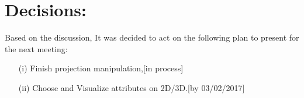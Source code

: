 \documentclass[a4paper, 11pt]{article}
\begin{document}
	\section*{Decisions:}
	
	Based on the discussion, It was decided to act on the following plan to present for the next meeting:
	\begin{itemize}
		\item[(i)] Finish projection manipulation,\hfill {\color{RedOrange}[in process]}
		\item[(ii)] Choose and Visualize attributes on 2D/3D.\hfill {\color{Red}[by 03/02/2017]}
	\end{itemize}
\end{document}
